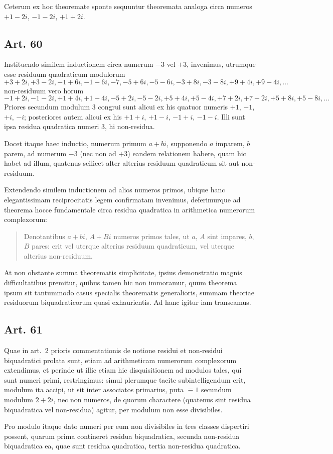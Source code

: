 \documentclass[12pt]{article}
\newcommand{\art}[1]{\subsection*{Art. #1}}
\begin{document}
Ceterum ex hoc theoremate sponte sequuntur theoremata analoga circa numeros $+1-2i$, $-1-2i$, $+1+2i$.

\art{60}
Instituendo similem inductionem circa numerum $-3$ vel $+3$, invenimus, utrumque esse residuum quadraticum modulorum
\[
+3+2i,
+3-2i,
-1+6i,
-1-6i,
-7,
-5+6i,
-5-6i,
-3+8i,
-3-8i,
+9+4i,
+9-4i,\ldots
\]
non-residuum vero horum
\[
-1+2i,
-1-2i,
+1+4i,
+1-4i,
-5+2i,
-5-2i,
+5+4i,
+5-4i,
+7+2i,
+7-2i,
+5+8i,
+5-8i,\ldots
\]
Priores secundum modulum $3$ congrui sunt alicui ex his quatuor numeris $+1$, $-1$, $+i$, $-i$; posteriores autem alicui ex his $+1+i$, $+1-i$, $-1+i$, $-1-i$. Illi sunt ipsa residua quadratica numeri $3$, hi non-residua.

Docet itaque haec inductio, numerum primum $a+bi$, supponendo $a$ imparem, $b$ parem, ad numerum $-3$ (nec non ad $+3$) eandem relationem habere, quam hic habet ad illum, quatenus scilicet alter alterius residuum quadraticum sit aut non-residuum.

Extendendo similem inductionem ad alios numeros primos, ubique hanc elegantissimam reciprocitatis legem confirmatam invenimus, deferimurque ad theorema hocce fundamentale circa residua quadratica in arithmetica numerorum complexorum:

\begin{quote}
Denotantibus $a+bi$, $A+Bi$ numeros primos tales, ut $a$, $A$ sint impares, $b$, $B$ pares: erit vel uterque alterius residuum quadraticum, vel uterque alterius non-residuum.
\end{quote}
At non obstante summa theorematis simplicitate, ipsius demonstratio magnis difficultatibus premitur, quibus tamen hic non immoramur, quum theorema ipsum sit tantummodo casus specialis theorematis generalioris, summam theoriae residuorum biquadraticorum quasi exhaurientis. Ad hanc igitur iam transeamus.

\art{61}
Quae in art.~2 prioris commentationis de notione residui et non-residui biquadratici prolata sunt, etiam ad arithmeticam numerorum complexorum extendimus, et perinde ut illic etiam hic disquisitionem ad modulos tales, qui sunt numeri primi, restringimus: simul plerumque tacite subintelligendum erit, modulum ita accipi, ut sit inter associatos primarius, puta $\equiv1$ secundum modulum $2+2i$, nec non numeros, de quorum charactere (quatenus sint residua biquadratica vel non-residua) agitur, per modulum non esse divisibiles.

Pro modulo itaque dato numeri per eum non divisibiles in tres classes dispertiri possent, quarum prima contineret residua biquadratica, secunda non-residua biquadratica ea, quae sunt residua quadratica, tertia non-residua quadratica.
\end{document}
